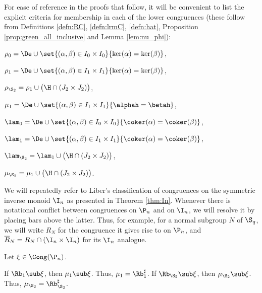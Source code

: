 %
For ease of reference in the proofs that follow, it will be convenient to list the explicit criteria for membership in each of the lower congruences (these follow from Definitions \ref{defn:RC}, \ref{defn:lrmC}, \ref{defn:hat}, Proposition \ref{prop:green_all_inclusive} and Lemma \ref{lem:nu_phi}):
\begin{itemize}\begin{multicols}{2}
\item $\rho_0=\De \cup \set{(\alpha,\beta)\in I_0\times I_0}{\ker(\alpha)=\ker(\beta)}$,

\item $\rho_1=\De \cup \set{(\alpha,\beta)\in I_1\times I_1}{\ker(\alpha)=\ker(\beta)}$,

\item $\rho_{\S_2}=\rho_1\cup\big( {\H}\cap(J_2\times J_2)\big)$,

\item $\mu_1= \De \cup \set{(\alpha,\beta)\in I_1\times I_1}{\alphah=\betah}$,

\item $\lam_0=\De \cup \set{(\alpha,\beta)\in I_0\times I_0}{\coker(\alpha)=\coker(\beta)}$,

\item $\lam_1=\De \cup \set{(\alpha,\beta)\in I_1\times I_1}{\coker(\alpha)=\coker(\beta)}$,

\item $\lam_{\S_2}=\lam_1\cup\big( {\H}\cap(J_2\times J_2)\big)$,

\item $\mu_{\S_2}=\mu_1\cup\big( {\H}\cap(J_2\times J_2)\big)$.
\end{multicols}\end{itemize}
%
We will repeatedly refer to Liber's classification of congruences on the symmetric inverse monoid $\I_n$ as presented in Theorem \ref{thm:In}.
Whenever there is notational conflict between congruences on $\P_n$ and on $\I_n$, we will resolve it by placing bars above the latter.
Thus, for example, for a normal subgroup $N$ of $\S_q$, we will write $R_N$ for the congruence it gives rise to on $\P_n$, and $\overline{R}_N=R_N\cap (\I_n\times\I_n)$ for its $\I_n$ analogue.



\begin{lemma}\label{lem:mn}
Let $\xi\in\Cong(\P_n)$.
\begin{itemize}
\begin{multicols}{2}
  If $\Rb_1\sub\xi$, then $\mu_1\sub\xi$.  Thus, $\mu_1=\Rb_1^\sharp$.
  If $\Rb_{\S_2}\sub\xi$, then $\mu_{\S_2}\sub\xi$.  Thus, $\mu_{\S_2}=\Rb_{\S_2}^\sharp$.
\end{multicols}
\end{itemize}
\end{lemma}


